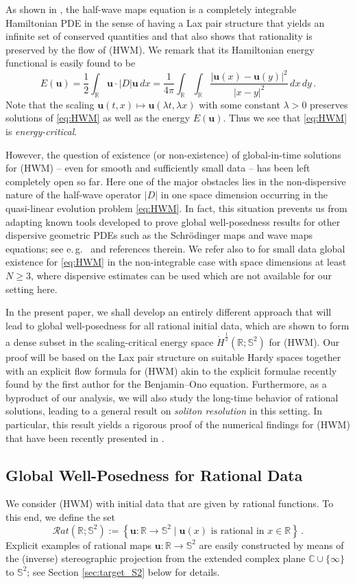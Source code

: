 \documentclass[11pt,reqno]{amsart}
\theoremstyle{definition}
\theoremstyle{remark}
\theoremstyle{remark}
\numberwithin{equation}{section}
\newcommand{\C}{\mathbb{C}}
\newcommand{\R}{\mathbb{R}}
\newcommand{\Ss}{\mathbb{S}}
\newcommand{\be}{\begin{equation}}
\newcommand{\ee}{\end{equation}}
\newcommand{\uu}{\mathbf{u}}
\begin{document}
\medskip
As shown in \cite{GeLe-18}, the half-wave maps equation is a completely integrable Hamiltonian PDE in the sense of having a Lax pair structure that yields an infinite set of conserved quantities and that also shows that rationality is preserved by the flow of (HWM). We remark that its Hamiltonian energy functional is easily found to be
\be
E(\uu) = \frac{1}{2} \int_{\R} \uu \cdot  |D| \uu  \, dx = \frac{1}{4 \pi} \int_{\R} \! \int_{\R} \frac{|\uu(x)-\uu(y)|^2}{|x-y|^2} \, dx \, dy \, .
\ee
Note that the scaling $\uu(t,x) \mapsto \uu(\lambda t, \lambda x)$ with some constant $\lambda > 0$ preserves solutions of \eqref{eq:HWM} as well as the energy $E(\uu)$. Thus we see that \eqref{eq:HWM} is {\em energy-critical}.

However, the question of existence (or non-existence) of global-in-time solutions for (HWM) -- even for smooth and sufficiently small data -- has been left completely open so far. Here one of the major obstacles lies in the non-dispersive nature of the half-wave operator $|D|$ in one space dimension occurring in the quasi-linear evolution problem \eqref{eq:HWM}. In fact, this situation prevents us from adapting known tools developed to prove global well-posedness results for other dispersive geometric PDEs such as the Schr\"odinger maps and wave maps equations; see e.\,g.~\cite{Ta-06,KotaVi-14} and references therein. We refer also to \cite{KrSi-18, KiKr-21, Li-23} for small data global existence for \eqref{eq:HWM} in the non-integrable case with space dimensions at least $N \geq 3$, where dispersive estimates can be used which are not available for our setting here. 

\medskip 
In the present paper, we shall develop an entirely different approach that will lead to global well-posedness for all rational initial data, which are shown to form a dense subset in the scaling-critical energy space $\dot{H}^{\frac 1 2}(\R; \Ss^2)$ for (HWM). Our proof will be based on the Lax pair structure on suitable Hardy spaces together with an explicit flow formula for (HWM) akin to the explicit formulae recently found by the first author for the Benjamin--Ono equation. Furthermore, as a byproduct of our analysis, we will also study the long-time behavior of rational solutions, leading to a general result on {\em soliton resolution} in this setting. In particular, this result  yields a rigorous proof of the numerical findings for (HWM) that have been recently presented in \cite{BeKlLa-20}. 


\subsection*{Global Well-Posedness for Rational Data}
We consider (HWM) with initial data that are given by rational functions. To this end, we define the set
$$
\mathcal{R}at(\R; \Ss^2) := \left \{ \uu : \R \to \Ss^2 \mid \mbox{$\uu(x)$ is rational in $x \in \R$}  \right \} \, .
$$
Explicit examples of rational maps $\uu : \R \to \Ss^2$ are easily constructed by means of the (inverse) stereographic projection from the extended complex plane $\C \cup \{ \infty \}$ to $\Ss^2$; see Section \ref{sec:target_S2} below for details.
\end{document}
